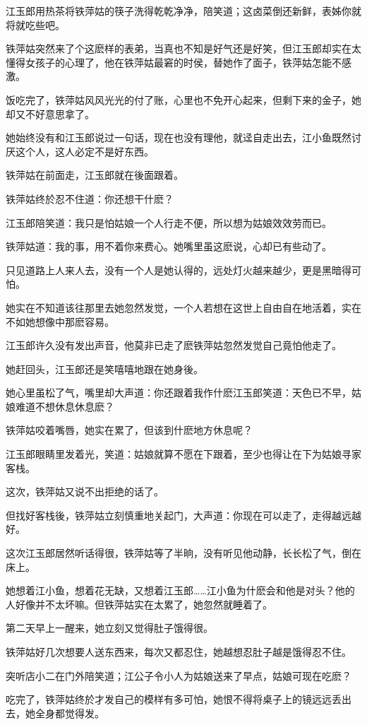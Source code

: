 \documentclass[12pt,oneside]{book}
\begin{document}
江玉郎用热茶将铁萍姑的筷子洗得乾乾净净，陪笑道；这卤菜倒还新鲜，表姊你就将就吃些吧。

铁萍姑突然来了个这麽样的表弟，当真也不知是好气还是好笑，但江玉郎却实在太懂得女孩子的心理了，他在铁萍姑最窘的时侯，替她作了面子，铁萍姑怎能不感激。

饭吃完了，铁萍姑风风光光的付了账，心里也不免开心起来，但剩下来的金子，她却又不好意思拿了。

她始终没有和江玉郎说过一句话，现在也没有理他，就迳自走出去，江小鱼既然讨厌这个人，这人必定不是好东西。

铁萍姑在前面走，江玉郎就在後面跟着。

铁萍姑终於忍不住道：你还想干什麽？

江玉郎陪笑道：我只是怕姑娘一个人行走不便，所以想为姑娘效效劳而已。

铁萍姑道：我的事，用不着你来费心。她嘴里虽这麽说，心却已有些动了。

只见道路上人来人去，没有一个人是她认得的，远处灯火越来越少，更是黑暗得可怕。

她实在不知道该往那里去她忽然发觉，一个人若想在这世上自由自在地活着，实在不如她想像中那麽容易。

江玉郎许久没有发出声音，他莫非已走了麽铁萍姑忽然发觉自己竟怕他走了。

她赶回头，江玉郎还是笑嘻嘻地跟在她身後。

她心里虽松了气，嘴里却大声道：你还跟着我作什麽江玉郎笑道：天色已不早，姑娘难道不想休息休息麽？

铁萍姑咬着嘴唇，她实在累了，但该到什麽地方休息呢？

江玉郎眼睛里发着光，笑道：姑娘就算不愿在下跟着，至少也得让在下为姑娘寻家客栈。

这次，铁萍姑又说不出拒绝的话了。

但找好客栈後，铁萍姑立刻慎重地关起门，大声道：你现在可以走了，走得越远越好。

这次江玉郎居然听话得很，铁萍姑等了半晌，没有听见他动静，长长松了气，倒在床上。

她想着江小鱼，想着花无缺，又想着江玉郎\ldots\ldots 江小鱼为什麽会和他是对头？他的人好像并不太坏嘛。但铁萍姑实在太累了，她忽然就睡着了。

第二天早上一醒来，她立刻又觉得肚子饿得很。

铁萍姑好几次想要人送东西来，每次又都忍住，她越想忍肚子越是饿得忍不住。

突听店小二在门外陪笑道；江公子令小人为姑娘送来了早点，姑娘可现在吃麽？

吃完了，铁萍姑终於才发自己的模样有多可怕，她恨不得将桌子上的镜远远丢出去，她全身都觉得发。
\end{document}
